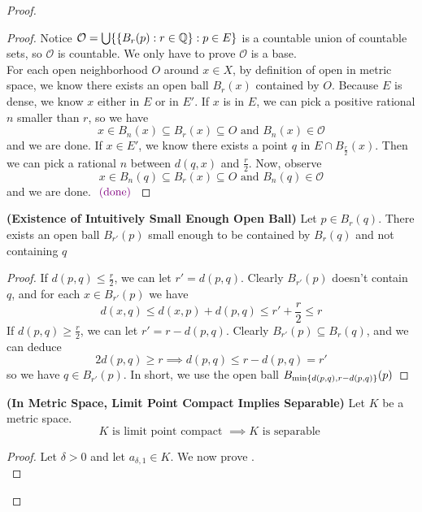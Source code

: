 \documentclass{report}
\begin{document}
\begin{proof}
\begin{proof}
Notice $\mathcal{O}=\bigcup \{ \{ B_r(p):r\in\mathbb{Q} \}:p\in E \}$ is a countable union of countable sets, so $\mathcal{O}$ is countable. We only have to prove $\mathcal{O}$ is a base.\\

For each open neighborhood $O$ around  $x\in X$, by definition of open in metric space, we know there exists an open ball $B_r(x)$ contained by $O$. Because $E$ is dense, we know  $x$ either in $E$ or in  $E'$. If $x$ is in  $E$, we can pick a positive rational  $n$ smaller than  $r$, so we have  
\begin{equation}
x\in B_n(x)\subseteq B_r(x)\subseteq O\text{ and }B_n(x)\in \mathcal{O} 
\end{equation}
and we are done. If $x\in E'$, we know there exists a point $q$ in  $E\cap B_{\frac{r}{2}}(x)$. Then we can pick a rational $n$ between $d(q,x)$ and $\frac{r}{2}$. Now, observe
\begin{equation}
x\in B_n(q)\subseteq B_r(x)\subseteq O\text{ and }B_n(q)\in \mathcal{O}
\end{equation}
and we are done. $\textcolor{violet}{\text{ (done) }}$
\end{proof}
\begin{lemma}
\label{1.10.2}
\textbf{(Existence of Intuitively Small Enough Open Ball)} Let $p\in  B_r(q)$. There exists an open ball $B_{r'}(p)$ small enough to be contained by $B_r(q)$ and not containing $q$ 
\end{lemma}
\begin{proof}
If $d(p,q)\leq \frac{r}{2}$, we can let $r'=d(p,q)$. Clearly $B_{r'}(p)$ doesn't contain $q$, and for each  $x\in B_{r'}(p)$ we have
\begin{equation}
d(x,q)\leq d(x,p)+d(p,q)\leq r'+\frac{r}{2}\leq r
\end{equation}
If $d(p,q)\geq \frac{r}{2}$, we can let $r'=r-d(p,q)$. Clearly $B_{r'}(p)\subseteq B_r(q)$, and we can deduce
\begin{equation}
2d(p,q)\geq r\implies d(p,q)\leq r-d(p,q)=r'
\end{equation}
so we have $q\in B_{r'}(p)$. In short, we use the open ball  $B_{\min \{ d(p,q),r-d(p,q) \}}(p)$
\end{proof}
\begin{theorem}
\label{1.10.3}
\textbf{(In Metric Space, Limit Point Compact Implies Separable)} Let $K$ be a metric space.
\begin{equation}
K\text{ is limit point compact }\implies K\text{ is separable }
\end{equation}
\end{theorem}
\begin{proof}
Let $\delta>0$ and let $a_{\delta, 1}\in K$. We now prove .\\


\end{proof}
\end{proof}
\end{document}
